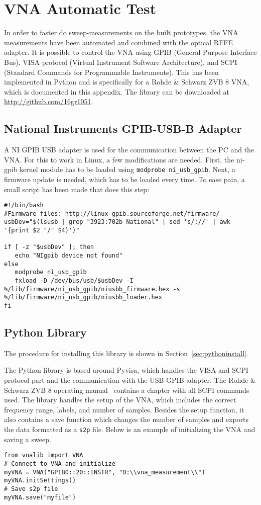 \section{VNA Automatic Test}
\label{sec:vna_python}
In order to faster do sweep-measurements on the built prototypes, the VNA measurements have been automated and combined with the optical RFFE adapter. It is possible to control the VNA using GPIB (General Purpose Interface Bus), VISA protocol (Virtual Instrument Software Architecture), and SCPI (Standard Commands for Programmable Instruments). This has been implemented in Python and is specifically for a Rohde \& Schwarz ZVB 8 VNA, which is documented in this appendix. The library can be downloaded at \url{http://github.com/16gr1051}.

\subsection{National Instruments GPIB-USB-B Adapter}
A NI GPIB USB adapter is used for the communication between the PC and the VNA. For this to work in Linux, a few modifications are needed. First, the ni-gpib kernel module has to be loaded using \verb|modprobe ni_usb_gpib|. Next, a firmware update is needed, which has to be loaded every time. To ease pain, a small script has been made that does this step:
\begin{lstlisting}
#!/bin/bash
#Firmware files: http://linux-gpib.sourceforge.net/firmware/
usbDev="$(lsusb | grep "3923:702b National" | sed 's/://' | awk '{print $2 "/" $4}')"

if [ -z "$usbDev" ]; then
   echo "NIgpib device not found"
else
   modprobe ni_usb_gpib
   fxload -D /dev/bus/usb/$usbDev -I %/lib/firmware/ni_usb_gpib/niusbb_firmware.hex -s %/lib/firmware/ni_usb_gpib/niusbb_loader.hex    
fi
\end{lstlisting}

\subsection{Python Library}
The procedure for installing this library is shown in Section~\ref{sec:pythoninstall}.

The Python library is based around Pyvisa, which handles the VISA and SCPI protocol part and the communication with the USB GPIB adapter. The Rohde \& Schwarz ZVB 8 operating manual~\cite{RhodeSmanual} contains a chapter with all SCPI commands used. The library handles the setup of the VNA, which includes the correct frequency range, labels, and number of samples. Besides the setup function, it also contains a save function which changes the number of samples and exports the data formatted as a \verb|s2p| file. Below is an example of initializing the VNA and saving a sweep. 
\begin{lstlisting}
from vnalib import VNA
# Connect to VNA and initialize
myVNA = VNA("GPIB0::20::INSTR", "D:\\vna_measurement\\")
myVNA.initSettings()
# Save s2p file
myVNA.save("myfile")
\end{lstlisting}
 
